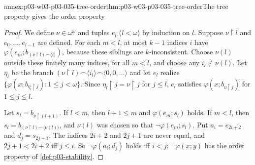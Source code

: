 \begin{annexitem}{annex:p03-w03-p03-035-tree-order}{thm:p03-w03-p03-035-tree-order}{The tree property gives the order property}
\begin{proof}
We define \(\nu\in\omega^\omega\) and tuples \(e_l\) (\(l<\omega\)) by
induction on \(l\).  Suppose \(\nu\restriction l\) and \(e_0,\ldots,e_{l-1}\)
are defined.  For each \(m<l\), at most \(k-1\) indices \(i\) have
\(\varphi(e_m;b_{(\nu\restriction l)\frown\langle i\rangle})\), because these
siblings are \(k\)-inconsistent.  Choose \(\nu(l)\) outside these finitely
many indices, for all \(m<l\), and choose any \(i_l\neq\nu(l)\).  Let
\(\eta_l\) be the branch \((\nu\restriction l)\frown\langle
i_l\rangle\frown\langle0,0,\ldots\rangle\) and let \(e_l\) realize
\(\{\varphi(x;b_{\eta_l\restriction j}):1\leq j<\omega\}\).  Since
\(\eta_l\restriction j=\nu\restriction j\) for \(j\leq l\), \(e_l\) satisfies
\(\varphi(x;b_{\nu\restriction j})\) for \(1\leq j\leq l\).

Let \(s_l=b_{\nu\restriction(l+1)}\).  If \(l<m\), then \(l+1\leq m\) and
\(\varphi(e_m;s_l)\) holds.  If \(m<l\), then
\(s_l=b_{(\nu\restriction l)\frown\langle\nu(l)\rangle}\), and \(\nu(l)\) was
chosen so that \(\neg\varphi(e_m;s_l)\).  Put \(a_i=e_{2i+2}\) and
\(d_j=s_{2j+1}\).  The indices \(2i+2\) and \(2j+1\) are never equal, and
\(2j+1<2i+2\) iff \(j\leq i\).  So \(\neg\varphi(a_i;d_j)\) holds iff \(i<j\):
\(\neg\varphi(x;y)\) has the order property of \cref{def:p03-stability}.
\end{proof}
\end{annexitem}

